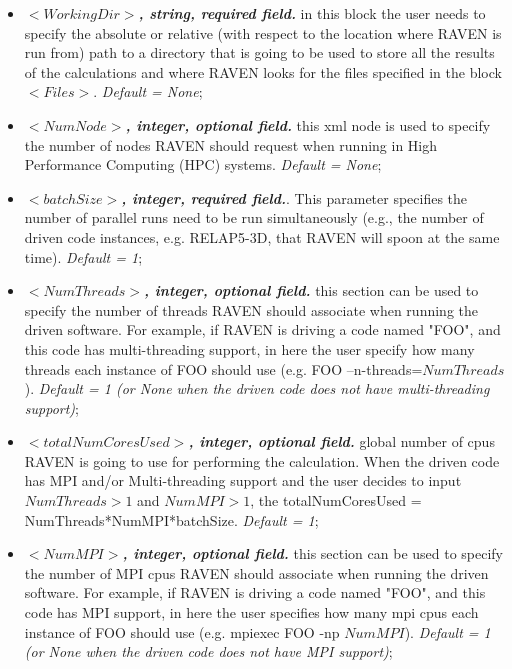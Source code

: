 \begin{itemize}
\item $<WorkingDir>$\textbf{\textit{, string, required field.}} in this block the user needs to specify the absolute or relative (with respect to the location where RAVEN is run from) path to a directory that is going to be used to store all the results of the calculations and where RAVEN looks for the files specified in the block $<Files>$. \textit{Default = None};

\item $<NumNode>$\textbf{\textit{, integer, optional field.}}  this xml node is used to specify the number of nodes RAVEN should request when running in High Performance Computing (HPC) systems. \textit{Default = None};

\item $<batchSize>$\textbf{\textit{, integer, required field.}}. This parameter specifies the number of parallel runs need to be run simultaneously (e.g., the number of driven code instances, e.g. RELAP5-3D, that RAVEN will spoon at the same time). \textit{Default = 1};

\item $<NumThreads>$\textbf{\textit{, integer, optional field.}} this section can be used to specify the number of threads RAVEN should associate when running the driven software. For example, if RAVEN is driving a code named "FOO", and this code has multi-threading support, in here the user specify how many threads each instance of FOO should use (e.g. FOO --n-threads=$NumThreads$). \textit{Default = 1 (or None when the driven code does not have multi-threading support)};

\item $<totalNumCoresUsed>$\textbf{\textit{, integer, optional field.}}  global number of cpus RAVEN is going to use for performing the calculation. When the driven code has MPI and/or  Multi-threading support and the user decides to input $NumThreads > 1$  and $NumMPI > 1$, the totalNumCoresUsed = NumThreads*NumMPI*batchSize. \textit{Default = 1};

\item $<NumMPI>$\textbf{\textit{, integer, optional field.}}  this section can be used to specify the number of MPI cpus RAVEN should associate when running the driven software. For example, if RAVEN is driving a code named "FOO", and this code has MPI support, in here the user specifies how many mpi cpus each instance of FOO should use (e.g. mpiexec FOO -np $NumMPI$). \textit{Default = 1 (or None when the driven code does not have MPI support)};


\end{itemize}
